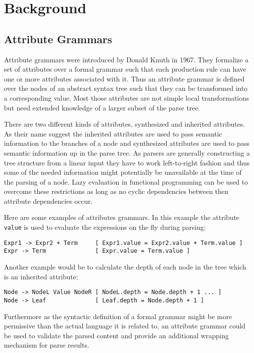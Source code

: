 \section{Background}
\subsection{Attribute Grammars}
Attribute grammars were introduced by Donald Knuth in 1967. They formalize a set of attributes over a formal grammar such that each production rule can have one or more attributes associated with it. Thus an attribute grammar is defined over the nodes of an abstract syntax tree such that they can be transformed into a corresponding value. Most those attributes are not simple local transformations but need extended knowledge of a larger subset of the parse tree.

There are two different kinds of attributes, synthesized and inherited attributes. As their name suggest the inherited attributes are used to pass semantic information to the branches of a node and synthesized attributes are used to pass semantic information up in the parse tree. As parsers are generally constructing a tree structure from a linear input they have to work left-to-right fashion and thus some of the needed information might potentially be unavailable at the time of the parsing of a node. Lazy evaluation in functional programming can be used to overcome these restrictions as long as no cyclic dependencies between then attribute dependencies occur.

Here are some examples of attributes grammars.
In this example the attribute \verb/value/ is used to evaluate the expressions on the fly during parsing:
\begin{verbatim}
Expr1 -> Expr2 + Term     [ Expr1.value = Expr2.value + Term.value ]
Expr -> Term              [ Expr.value = Term.value ]
\end{verbatim}
Another example would be to calculate the depth of each node in the tree which is an inherited attribute:
\begin{verbatim}
Node -> NodeL Value NodeR [ NodeL.depth = Node.depth + 1 ... ] 
Node -> Leaf              [ Leaf.depth = Node.depth + 1 ]
\end{verbatim}

Furthermore as the syntactic definition of a formal grammar might be more permissive than the actual language it is related to, an attribute grammar could be used to validate the parsed content and provide an additional wrapping mechanism for parse results. 

